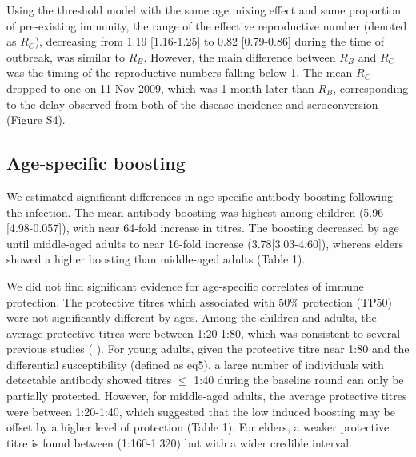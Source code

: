 \documentclass{article}
\begin{document}
Using the threshold model with the same age mixing effect and same proportion of pre-existing immunity, the range of the effective reproductive number (denoted as $R_{C}$), decreasing from 1.19 [1.16-1.25] to 0.82 [0.79-0.86] during the time of outbreak, was similar to $R_{B}$. However, the main difference between $R_{B}$ and $R_{C}$ was the timing of the reproductive numbers falling below 1. The mean $R_{C}$ dropped to one on 11 Nov 2009, which was 1 month later than $R_{B}$, corresponding to the delay observed from both of the disease incidence and seroconversion (Figure S4).


\subsection{Age-specific boosting}
We estimated significant differences in age specific antibody boosting following the infection. The mean antibody boosting was highest among children (5.96 [4.98-0.057]), with near 64-fold increase in titres. The boosting decreased by age until middle-aged adults to near 16-fold increase (3.78[3.03-4.60]), whereas elders showed a higher boosting than middle-aged adults (Table 1).

We did not find significant evidence for age-specific correlates of immune protection. The protective titres which associated with 50$\%$ protection (TP50) were not significantly different by ages. Among the children and adults, the average protective titres were between 1:20-1:80, which was consistent to several previous studies (\cite{Hobson1972} \cite{Coudeville2010}). For young adults, given the protective titre near 1:80 and the differential susceptibility (defined as eq5), a large number of individuals with detectable antibody showed titres $\leq$ 1:40 during the baseline round can only be partially protected. However, for middle-aged adults, the average protective titres were between 1:20-1:40, which suggested that the low induced boosting may be offset by a higher level of protection (Table 1). For elders, a weaker protective titre is found between (1:160-1:320) but with a wider credible interval. 
\end{document}
